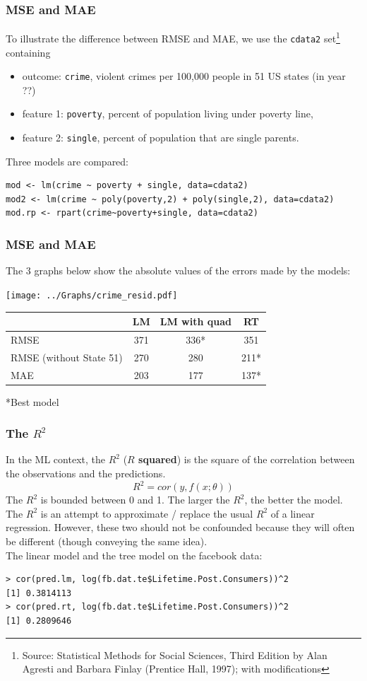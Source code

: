 \begin{frame}[fragile]
\frametitle{MSE and MAE}
To illustrate the difference between RMSE and MAE, we use the {\tt cdata2} set\footnote{Source: Statistical Methods for Social Sciences, Third Edition by Alan Agresti and Barbara Finlay (Prentice Hall, 1997); with modifications} containing 
\begin{itemize}
\item outcome: {\tt crime}, violent crimes per 100,000 people in 51 US states (in year ??)
\item feature 1: {\tt poverty}, percent of population living under poverty line, 
\item feature 2: {\tt single}, percent of population that are single parents.
\end{itemize}
Three models are compared:\\
\scriptsize 
\begin{verbatim}
mod <- lm(crime ~ poverty + single, data=cdata2)
mod2 <- lm(crime ~ poly(poverty,2) + poly(single,2), data=cdata2)
mod.rp <- rpart(crime~poverty+single, data=cdata2)
\end{verbatim}
\normalsize
\end{frame}
\begin{frame}
\frametitle{MSE and MAE}
The 3 graphs below show the absolute values of the errors made by the models:
\scriptsize
\begin{center}
\texttt{[image: ../Graphs/crime\_resid.pdf]}
\begin{tabular}{l | ccc}
& LM & LM with quad & RT \\
\hline
RMSE & 371 & 336* & 351 \\
RMSE (without State 51) & 270 & 280 & 211*\\
MAE & 203 & 177 & 137*\\
\hline
\end{tabular}
\end{center}
*Best model
\normalsize
\end{frame}
\begin{frame}[fragile]
\frametitle{The $R^2$}
In the ML context, the $R^2$ ({\bf $R$ squared}) is the square of the correlation between the observations and the predictions. 
$$
R^2 = cor(y,f(x;\theta))
$$
The $R^2$ is bounded between 0 and 1. The larger the $R^2$, the better the model.\\
\vspace{0.3cm}
The $R^2$ is an attempt to approximate / replace the usual $R^2$ of a linear regression. However, these two should not be confounded because they will often be different (though conveying the same idea).\\
\vspace{0.3cm}
The linear model and the tree model on the facebook data:
\scriptsize
\begin{verbatim}
> cor(pred.lm, log(fb.dat.te$Lifetime.Post.Consumers))^2
[1] 0.3814113
> cor(pred.rt, log(fb.dat.te$Lifetime.Post.Consumers))^2
[1] 0.2809646
\end{verbatim}
\normalsize
\end{frame}
